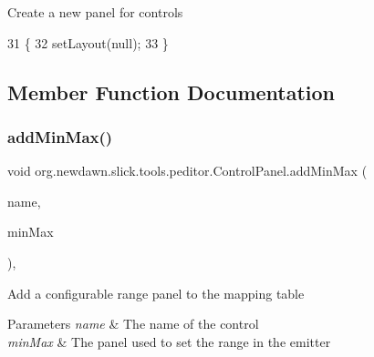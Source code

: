 Create a new panel for controls 
\begin{DoxyCode}
31                           \{
32         setLayout(null);
33     \}
\end{DoxyCode}


\subsection{Member Function Documentation}
\mbox{\label{classorg_1_1newdawn_1_1slick_1_1tools_1_1peditor_1_1_control_panel_aae097ab8bc9bd722af51818b15bcc823}} 
\subsubsection{\texorpdfstring{add\+Min\+Max()}{addMinMax()}}
{\footnotesize\ttfamily void org.\+newdawn.\+slick.\+tools.\+peditor.\+Control\+Panel.\+add\+Min\+Max (\begin{DoxyParamCaption}\item[{String}]{name,  }\item[{\mbox{\hyperlink{classorg_1_1newdawn_1_1slick_1_1tools_1_1peditor_1_1_min_max_panel}{Min\+Max\+Panel}}}]{min\+Max }\end{DoxyParamCaption})\hspace{0.3cm}{\ttfamily [inline]}, {\ttfamily [protected]}}

Add a configurable range panel to the mapping table


\begin{DoxyParams}{Parameters}
{\em name} & The name of the control \\
\hline
{\em min\+Max} & The panel used to set the range in the emitter \\
\hline
\end{DoxyParams}

